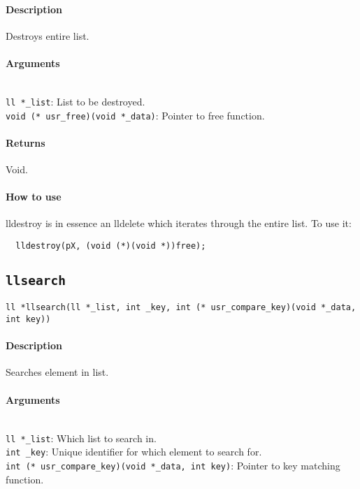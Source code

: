 \documentclass{article}
\begin{document}
\paragraph{Description}
Destroys entire list.

\paragraph{Arguments}
\verb| |\\
\verb|ll *_list|: List to be destroyed.\\
\verb|void (* usr_free)(void *_data)|: Pointer to free function.

\paragraph{Returns}
Void.

\paragraph{How to use}

lldestroy is in essence an lldelete which iterates through the entire list. To use it:\\[8pt]
\begin{verbatim}
  lldestroy(pX, (void (*)(void *))free);
\end{verbatim}

\subsection{\texttt{llsearch}}
\label{llsearch}
\verb|ll *llsearch(ll *_list, int _key, int (* usr_compare_key)(void *_data, int key))|

\paragraph{Description}
Searches element in list.

\paragraph{Arguments}
\verb| |\\
\verb|ll *_list|: Which list to search in.\\
\verb|int _key|: Unique identifier for which element to search for.\\
\verb|int (* usr_compare_key)(void *_data, int key)|: Pointer to key matching function.
\end{document}
